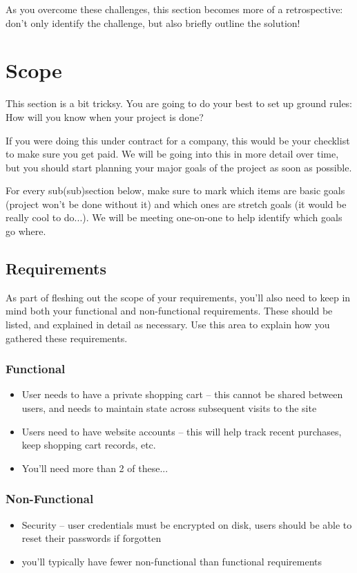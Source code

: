 \documentclass[10pt,conference,onecolumn,compsoc]{IEEEtran}
\begin{document}
As you overcome these challenges, this section becomes more of a retrospective: don't only identify the challenge, but also briefly outline the solution!


\section{Scope}
This section is a bit tricksy.  You are going to do your best to set up ground rules:  How will you know when your project is done?

If you were doing this under contract for a company, this would be your checklist to make sure you get paid.  We will be going into this in more detail over time, but you should start planning your major goals of the project as soon as possible.

For every sub(sub)section below, make sure to mark which items are basic goals (project won't be done without it) and which ones are stretch goals (it would be really cool to do...).  We will be meeting one-on-one to help identify which goals go where.

\subsection{Requirements}
As part of fleshing out the scope of your requirements, you'll also need to keep in mind both your functional and non-functional requirements.  These should be listed, and explained in detail as necessary.  Use this area to explain how you gathered these requirements.

\subsubsection{Functional}
\begin{itemize}
\item User needs to have a private shopping cart -- this cannot be shared between users, and needs to maintain state across subsequent visits to the site
\item Users need to have website accounts -- this will help track recent purchases, keep shopping cart records, etc.
\item You'll need more than 2 of these...
\end{itemize}

\subsubsection{Non-Functional}
\begin{itemize}
\item Security -- user credentials must be encrypted on disk, users should be able to reset their passwords if forgotten
\item you'll typically have fewer non-functional than functional requirements
\end{itemize}
\end{document}
